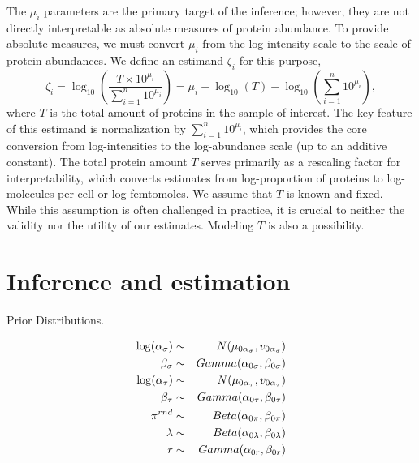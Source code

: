 The $\mu_i$ parameters are the primary target of the inference; however, they are not directly interpretable as absolute measures of protein abundance.
To provide absolute measures, we must convert $\mu_i$ from the log-intensity scale to the scale of protein abundances.
We define an estimand $\zeta_i$ for this purpose, 
%
\begin{equation}
\zeta_i = \log_{10} \left( \frac{T \times 10^{\mu_i}}{ \sum_{i=1}^{n} 10^{\mu_i}} \right) = \mu_i + \log_{10}(T) - \log_{10}\left(\sum_{i=1}^{n} 10^{\mu_i}\right), \label{proteomics:eq:abs_abund_estimand} 
\end{equation}
%
where $T$ is the total amount of proteins in the sample of interest.
The key feature of this estimand is normalization by $\sum_{i=1}^n 10^{\mu_i}$, which provides the core conversion from log-intensities to the log-abundance scale (up to an additive constant).
The total protein amount $T$ serves primarily as a rescaling factor for interpretability, which converts estimates from log-proportion of proteins to log-molecules per cell or log-femtomoles. 
We assume that $T$ is known and fixed. While this assumption is often challenged in practice, it is crucial to neither the validity nor the utility of our estimates. Modeling $T$ is also a possibility.



\section{Inference and estimation}
\label{proteomics:sec:estimation}

\ifx\nofigures\undefined
\begin{table}
\caption{Prior Distributions. \label{proteomics:table:priors}}
\begin{eqnarray*}
\log(\alpha_\sigma) &\sim& N(\mu_{0 \alpha_\sigma}, v_{0 \alpha_\sigma}) \\
\beta_\sigma &\sim& Gamma(\alpha_{0 \sigma}, \beta_{0 \sigma}) \\
\log(\alpha_\tau) &\sim& N(\mu_{0 \alpha_\tau}, v_{0 \alpha_\tau}) \\
\beta_\tau &\sim& Gamma(\alpha_{0 \tau}, \beta_{0 \tau}) \\
\mbox{\ensuremath{\pi}}^{rnd} & \sim & Beta(\alpha_{0\pi}, \beta_{0\pi})\\
\lambda & \sim & Beta(\alpha_{0 \lambda}, \beta_{0 \lambda})\\
r & \sim & Gamma(\alpha_{0r}, \beta_{0r})
\end{eqnarray*}
\end{table}
\fi


